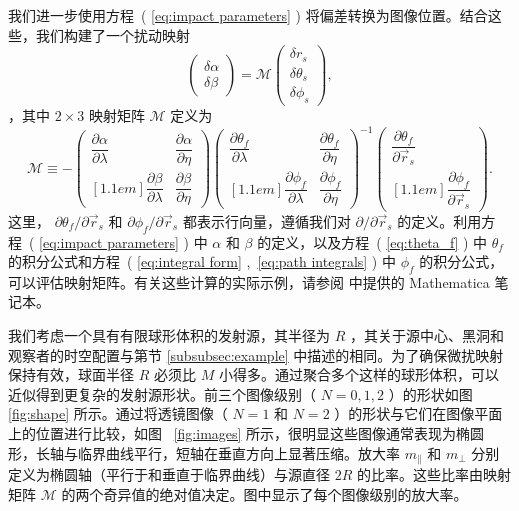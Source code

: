 \documentclass[aps,reprint,superscriptaddress,nofootinbib,floatfix,longbibliography,preprintnumbers]{revtex4-1}
\newcommand{\p}{\partial}
\begin{document}
我们进一步使用方程~(    \ref{eq:impact parameters}    ) 将偏差转换为图像位置。结合这些，我们构建了一个扰动映射
   \begin{equation}
    \left(\begin{matrix}
        \delta\alpha  \\  
        \delta\beta
    \end{matrix}\right) = \mathcal{M} \left(\begin{matrix}
        \delta r_s  \\  
        \delta \theta_s  \\  
        \delta \phi_s
    \end{matrix}\right),
\end{equation}   ，其中    $2\times 3$    映射矩阵    $\mathcal{M}$    定义为
   \begin{equation}
    \mathcal{M} \equiv - \begin{pmatrix}
        \dfrac{\p\alpha}{\p\lambda} & \dfrac{\p\alpha}{\p\eta}  \\ [1.1em]
        \dfrac{\p\beta}{\p\lambda} & \dfrac{\p\beta}{\p\eta}
    \end{pmatrix}
    \begin{pmatrix}
        \dfrac{\p\theta_{f}}{\p\lambda} & \dfrac{\p\theta_{f}}{\p\eta}  \\ [1.1em]
        \dfrac{\p\phi_{f}}{\p\lambda} & \dfrac{\p\phi_{f}}{\p\eta}
    \end{pmatrix}^{-1}
    \begin{pmatrix}
        \dfrac{\p\theta_{f}}{\p \vec{r}_s}  \\ [1.1em] 
        \dfrac{\p\phi_{f}}{\p \vec{r}_s} 
    \end{pmatrix}.
    \label{eq:shape matrix}
\end{equation}    这里，   $\p\theta_f/\p\vec{r}_s$    和    $\p\phi_f/\p\vec{r}_s$    都表示行向量，遵循我们对    $\partial/\partial \vec{r}_s$    的定义。利用方程~(    \ref{eq:impact parameters}    ) 中    $\alpha$    和    $\beta$    的定义，以及方程~(    \ref{eq:theta_f}    ) 中    $\theta_f$    的积分公式和方程~(    \ref{eq:integral form}    ,\,    \ref{eq:path integrals}    ) 中    $\phi_f$    的积分公式，可以评估映射矩阵。有关这些计算的实际示例，请参阅    \cite{KerrP2P}    中提供的 Mathematica 笔记本。  

我们考虑一个具有有限球形体积的发射源，其半径为    $R$   ，其关于源中心、黑洞和观察者的时空配置与第节    \ref{subsubsec:example}    中描述的相同。为了确保微扰映射保持有效，球面半径    $R$    必须比    $M$    小得多。通过聚合多个这样的球形体积，可以近似得到更复杂的发射源形状。前三个图像级别（   $N = 0, 1, 2$   ）的形状如图~    \ref{fig:shape}    所示。通过将透镜图像（   $N = 1$    和    $N = 2$   ）的形状与它们在图像平面上的位置进行比较，如图~    \ref{fig:images}    所示，很明显这些图像通常表现为椭圆形，长轴与临界曲线平行，短轴在垂直方向上显著压缩。放大率    $m_{\parallel}$    和    $m_{\perp}$    分别定义为椭圆轴（平行于和垂直于临界曲线）与源直径    $2R$    的比率。这些比率由映射矩阵    $\mathcal{M}$    的两个奇异值的绝对值决定。图中显示了每个图像级别的放大率。  
\end{document}
